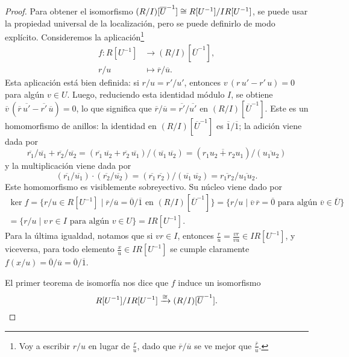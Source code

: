 \begin{proof}
  Para obtener el isomorfismo
  $(R/I) [\overline{U}^{-1}] \cong R [U^{-1}] / I R [U^{-1}]$, se puede usar
  la propiedad universal de la localización, pero se puede definirlo de modo
  explícito. Consideremos la aplicación\footnote{Voy a escribir $r/u$ en lugar
    de $\frac{r}{u}$, dado que $\overline{r}/\overline{u}$ se ve mejor que
    $\frac{\overline{r}}{\overline{u}}$.}
  \begin{align*}
  f\colon R [U^{-1}] & \to (R/I) [\overline{U}^{-1}],\\
    r/u & \mapsto \overline{r}/\overline{u}.
  \end{align*}
  Esta aplicación está bien definida: si $r/u = r'/u'$, entonces
  $v\,(r\,u' - r'\,u) = 0$ para algún $v\in U$. Luego, reduciendo esta identidad
  módulo $I$, se obtiene
  $\overline{v}\,(\overline{r}\,\overline{u'} - \overline{r'}\,\overline{u}) =
  0$, lo que significa que
  $\overline{r}/\overline{u} = \overline{r'}/\overline{u'}$ en
  $(R/I) [\overline{U}^{-1}]$. Este es un homomorfismo de anillos: la identidad
  en $(R/I) [\overline{U}^{-1}]$ es $\overline{1}/\overline{1}$; la adición
  viene dada por
  \[ \overline{r_1}/\overline{u_1} + \overline{r_2}/\overline{u_2} =
     (\overline{r_1}\,\overline{u_2} +
     \overline{r_2}\,\overline{u_1})/(\overline{u_1}\,\overline{u_2}) =
     (\overline{r_1 u_2 + r_2 u_1})/(\overline{u_1 u_2}) \]
  y la multiplicación viene dada por
  \[ (\overline{r_1}/\overline{u_1}) \cdot (\overline{r_2}/\overline{u_2}) =
     (\overline{r_1}\,\overline{r_2})/(\overline{u_1}\,\overline{u_2}) =
     \overline{r_1 r_2}/\overline{u_1 u_2}. \]
  Este homomorfismo es visiblemente sobreyectivo. Su núcleo viene dado por
  \begin{multline*}
    \ker f = \{ r/u \in R [U^{-1}] \mid \overline{r}/\overline{u} =
    \overline{0}/\overline{1} \text{ en } (R/I) [\overline{U}^{-1}] \} =
    \{ r/u \mid \overline{v}\,\overline{r} =
    \overline{0} \text{ para algún }\overline{v}\in \overline{U} \} \\
    = \{ r/u \mid v\,r \in I \text{ para algún }v\in U \} = I R [U^{-1}].
  \end{multline*}
  Para la última igualdad, notamos que si $vr \in I$, entonces
  $\frac{r}{u} = \frac{vr}{vu} \in I R [U^{-1}]$, y viceversa, para todo
  elemento $\frac{x}{u} \in I R [U^{-1}]$ se cumple claramente
  $f (x/u) = \overline{0}/\overline{u} = \overline{0}/\overline{1}$.

  El primer teorema de isomorfía nos dice que $f$ induce un isomorfismo
  \[ R [U^{-1}]/I R [U^{-1}] \xrightarrow{\cong} (R/I) [\overline{U}^{-1}]. \qedhere \]
\end{proof}

